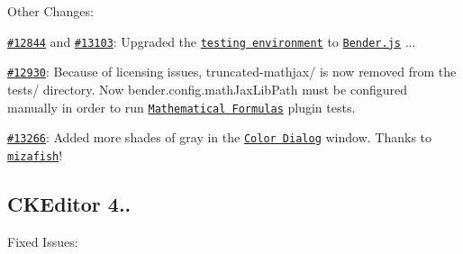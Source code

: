 Other Changes\+:


\begin{DoxyItemize}
\item \href{http://dev.ckeditor.com/ticket/12844}{\tt \#12844} and \href{http://dev.ckeditor.com/ticket/13103}{\tt \#13103}\+: Upgraded the \href{http://docs.ckeditor.com/#!/guide/dev_tests}{\tt testing environment} to \href{https://github.com/benderjs/benderjs}{\tt Bender.\+js} {..}.
\item \href{http://dev.ckeditor.com/ticket/12930}{\tt \#12930}\+: Because of licensing issues, {\ttfamily truncated-\/mathjax/} is now removed from the {\ttfamily tests/} directory. Now {\ttfamily bender.\+config.\+math\+Jax\+Lib\+Path} must be configured manually in order to run \href{http://ckeditor.com/addon/mathjax}{\tt Mathematical Formulas} plugin tests.
\item \href{http://dev.ckeditor.com/ticket/13266}{\tt \#13266}\+: Added more shades of gray in the \href{http://ckeditor.com/addon/colordialog}{\tt Color Dialog} window. Thanks to \href{https://github.com/mizafish}{\tt mizafish}!
\end{DoxyItemize}

\subsection*{C\+K\+Editor 4..}

Fixed Issues\+:


